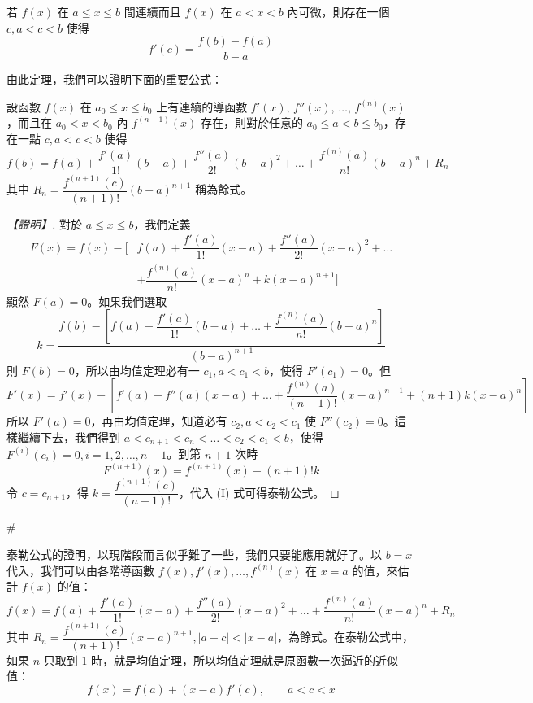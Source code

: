 \begin{theorem}[均值定理]\label{thm:b6s-app4-mvt}
若 $f(x)$ 在 $a\le x\le b$ 間連續而且 $f(x)$ 在 $a<x<b$ 內可微，則存在一個 $c, a<c<b$ 使得
\[ f'(c) = \dfrac{f(b)-f(a)}{b-a} \]
\end{theorem}

由此定理，我們可以證明下面的重要公式：

\begin{theorem}[泰勒公式]\label{thm:b6s-app4-taylor}
設函數 $f(x)$ 在 $a_0\le x\le b_0$ 上有連續的導函數 $f'(x)$, $f''(x)$, $\dots$, $f^{(n)}(x)$，而且在 $a_0<x<b_0$ 內 $f^{(n+1)}(x)$ 存在，則對於任意的 $a_0\le a<b\le b_0$，存在一點 $c, a<c<b$ 使得
\[ f(b) = f(a) + \dfrac{f'(a)}{1!}(b-a) + \dfrac{f''(a)}{2!}(b-a)^2 + \dots + \dfrac{f^{(n)}(a)}{n!}(b-a)^n + R_n \]
其中 $R_n = \dfrac{f^{(n+1)}(c)}{(n+1)!}(b-a)^{n+1}$ 稱為餘式。
\end{theorem}

\begin{proof}[【證明】]
對於 $a\le x\le b$，我們定義
\begin{align*}
F(x) = f(x) - \biggl[ &f(a) + \dfrac{f'(a)}{1!}(x-a) + \dfrac{f''(a)}{2!}(x-a)^2 + \dots \\
&+ \dfrac{f^{(n)}(a)}{n!}(x-a)^n + k(x-a)^{n+1} \biggr]
\end{align*}
顯然 $F(a)=0$。如果我們選取
\begin{equation}
k = \dfrac{f(b) - \left[ f(a) + \dfrac{f'(a)}{1!}(b-a) + \dots + \dfrac{f^{(n)}(a)}{n!}(b-a)^n \right]}{(b-a)^{n+1}} \tag{I} \label{eq:b6s-app4-taylor-k}
\end{equation}
則 $F(b)=0$，所以由均值定理必有一 $c_1, a<c_1<b$，使得 $F'(c_1)=0$。但
\[ F'(x) = f'(x) - \left[ f'(a) + f''(a)(x-a) + \dots + \dfrac{f^{(n)}(a)}{(n-1)!}(x-a)^{n-1} + (n+1)k(x-a)^n \right] \]
所以 $F'(a)=0$，再由均值定理，知道必有 $c_2, a<c_2<c_1$ 使 $F''(c_2)=0$。這樣繼續下去，我們得到 $a<c_{n+1}<c_n<\dots<c_2<c_1<b$，使得 $F^{(i)}(c_i)=0, i=1, 2, \dots, n+1$。到第 $n+1$ 次時
\[ F^{(n+1)}(x) = f^{(n+1)}(x) - (n+1)!k \]
令 $c=c_{n+1}$，得 $k = \dfrac{f^{(n+1)}(c)}{(n+1)!}$，代入 (I) 式可得泰勒公式。
\end{proof}\hfill$\#$

泰勒公式的證明，以現階段而言似乎難了一些，我們只要能應用就好了。以 $b=x$ 代入，我們可以由各階導函數 $f(x), f'(x), \dots, f^{(n)}(x)$ 在 $x=a$ 的值，來估計 $f(x)$ 的值：
\[ f(x) = f(a) + \dfrac{f'(a)}{1!}(x-a) + \dfrac{f''(a)}{2!}(x-a)^2 + \dots + \dfrac{f^{(n)}(a)}{n!}(x-a)^n + R_n \]
其中 $R_n = \dfrac{f^{(n+1)}(c)}{(n+1)!}(x-a)^{n+1}, |a-c|<|x-a|$，為餘式。在泰勒公式中，如果 $n$ 只取到 1 時，就是均值定理，所以均值定理就是原函數一次逼近的近似值：
\[ f(x) = f(a) + (x-a)f'(c), \qquad a<c<x \]

